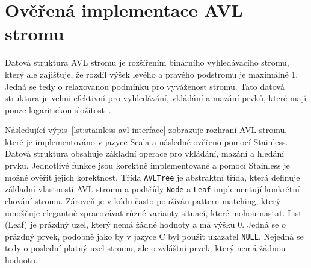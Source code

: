 

\section{Ověřená implementace AVL stromu}
\label{sec:stainless-avl}

Datová struktura AVL stromu je rozšířením binárního vyhledávacího stromu,
který ale zajišťuje, že rozdíl výšek levého a pravého podstromu je maximálně 1.
Jedná se tedy o relaxovanou podmínku pro vyváženost stromu.
Tato datová struktura je velmi efektivní pro vyhledávání, vkládání a mazání prvků,
které mají pouze logaritickou složitost~\cite{Pruvodce22}.

Následující výpis~\ref{lst:stainless-avl-interface} zobrazuje rozhraní AVL stromu,
které je implementováno v jazyce Scala a následně ověřeno pomocí Stainless.
Datová struktura obsahuje základní operace pro vkládání, mazání a hledání prvku.
Jednotlivé funkce jsou korektně implementované a pomocí Stainless je možné ověřit jejich korektnost.
Třída \texttt{AVLTree} je abstraktní třída, která definuje základní vlastnosti AVL stromu
a podtřídy \texttt{Node} a \texttt{Leaf} implementují konkrétní chování stromu.
Zároveň je v kódu často používán pattern matching,
který umožňuje elegantně zpracovávat různé varianty situací, které mohou nastat.
List (Leaf) je prázdný uzel, který nemá žádné hodnoty a má výšku 0.
Jedná se o prázdný prvek, podobně jako by v jazyce C byl použit ukazatel \texttt{NULL}.
Nejedná se tedy o poslední platný uzel stromu, ale o zvláštní prvek, který nemá žádnou hodnotu.

